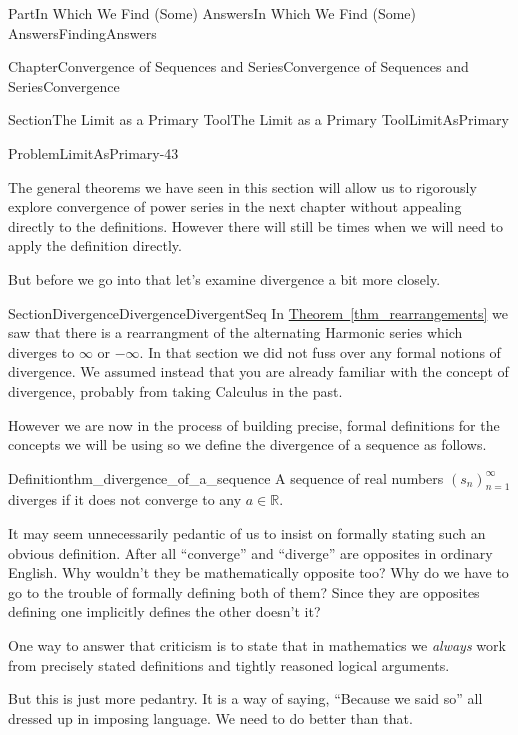\documentclass[oneside,10pt,]{book}
\newcommand{\xreffont}{\relax}
\numberwithin{equation}{part}
\newcommand{\RR}{\mathbb {R}}
\begin{document}
\begin{partptx}{Part}{In Which We Find (Some) Answers}{}{In Which We Find (Some) Answers}{}{}{FindingAnswers}
\begin{chapterptx}{Chapter}{Convergence of Sequences and Series}{}{Convergence of Sequences and Series}{}{}{Convergence}
\begin{sectionptx}{Section}{The Limit as a Primary Tool}{}{The Limit as a Primary Tool}{}{}{LimitAsPrimary}
\begin{problem}{Problem}{}{LimitAsPrimary-43}
%
\end{problem}
The general theorems we have seen in this section will allow us to rigorously explore convergence of power series in the next chapter without appealing directly to the definitions.  However there will still be times when we will need to apply the definition directly.%
\par
But before we go into that let's examine divergence a bit more closely.%
\end{sectionptx}
%
%
\typeout{************************************************}
\typeout{************************************************}
%
\begin{sectionptx}{Section}{Divergence}{}{Divergence}{}{}{DivergentSeq}
In \hyperref[thm_rearrangements]{Theorem~{\xreffont\ref{thm_rearrangements}}} we saw that there is a rearrangment of the alternating Harmonic series which diverges to \(\infty\) or \(-\infty\). In that section we did not fuss over any formal notions of divergence. We assumed instead that you are already familiar with the concept of divergence, probably from taking Calculus in the past.%
\par
However we are now in the process of building precise, formal definitions for the concepts we will be using so we define the divergence of a sequence as follows.%
\begin{definition}{Definition}{}{thm_divergence_of_a_sequence}%
%
%
A sequence of real numbers \(\left(s_n\right)_{n=1}^\infty\) diverges if it does not converge to any \(a\in\RR\).%
\end{definition}
It may seem unnecessarily pedantic of us to insist on formally stating such an obvious definition. After all ``converge'' and ``diverge'' are opposites in ordinary English. Why wouldn't they be mathematically opposite too? Why do we have to go to the trouble of formally defining both of them? Since they are opposites defining one implicitly defines the other doesn't it?%
\par
One way to answer that criticism is to state that in mathematics we \emph{always} work from precisely stated definitions and tightly reasoned logical arguments.%
\par
But this is just more pedantry. It is a way of saying, ``Because we said so'' all dressed up in imposing language. We need to do better than that.%
\par

\end{sectionptx}
\end{chapterptx}
\end{partptx}
\end{document}
